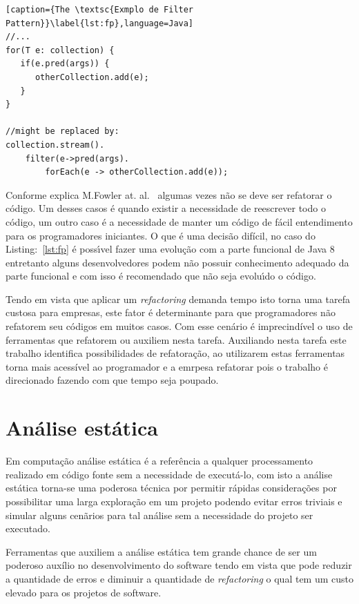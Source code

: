 \begin{lstlisting}[caption={The \textsc{Exmplo de Filter Pattern}}\label{lst:fp},language=Java] 
//...
for(T e: collection) {
   if(e.pred(args)) {
      otherCollection.add(e);
   }
}

//might be replaced by:
collection.stream().
	filter(e->pred(args).
		forEach(e -> otherCollection.add(e));
\end{lstlisting}


Conforme explica M.Fowler at. al.~\cite{martinFowlerRafactoring} algumas vezes n\~{a}o se deve ser refatorar o c\'{o}digo. Um desses casos \'{e} quando existir a necessidade de reescrever todo o c\'{o}digo, um outro caso \'{e} a necessidade de manter um  c\'{o}digo de f\'{a}cil entendimento para os programadores iniciantes. O que \'{e} uma decis\~{a}o dif\'{i}cil, no caso do Listing:~\ref{lst:fp} \'{e} poss\'{\i}vel fazer uma evolu\c{c}\~{a}o com a parte funcional de Java 8 entretanto alguns desenvolvedores podem n\~{a}o possuir  conhecimento adequado da parte funcional e com isso \'{e} recomendado que n\~{a}o seja evolu\'{\i}do o c\'{o}digo.


Tendo em vista que aplicar um \textit{refactoring} demanda tempo isto torna uma tarefa custosa para empresas, este fator \'{e} determinante para que programadores n\~{a}o refatorem seu c\'{o}digos em muitos casos. Com esse cen\'{a}rio \'{e} imprecind\'{i}vel o uso de ferramentas que refatorem ou auxiliem nesta tarefa. Auxiliando nesta tarefa este trabalho identifica possibilidades de refatora\c{c}\~{a}o, ao utilizarem estas ferramentas torna mais acessível ao programador e a emrpesa refatorar pois o trabalho é direcionado fazendo com que tempo seja poupado.



\section{Análise estática}\label{sec:as}

Em computa\c{c}\~{a}o an\'{a}lise est\'{a}tica \'{e} a refer\^{e}ncia a qualquer processamento realizado em c\'{o}digo fonte sem a necessidade de execut\'{a}-lo, com isto a an\'{a}lise est\'{a}tica torna-se uma poderosa t\'{e}cnica por permitir r\'{a}pidas considera\c{c}\~{o}es por possibilitar uma larga explora\c{c}\~{a}o em um projeto podendo evitar erros triviais e simular alguns cen\~{a}rios para tal an\'{a}lise sem a necessidade do projeto ser executado.

Ferramentas que auxiliem a an\'{a}lise est\'{a}tica tem grande chance de ser um poderoso aux\'{i}lio no desenvolvimento do software tendo em vista que pode reduzir a quantidade de erros e diminuir a quantidade de \textit{refactoring} o qual tem um custo elevado para os projetos de software.

